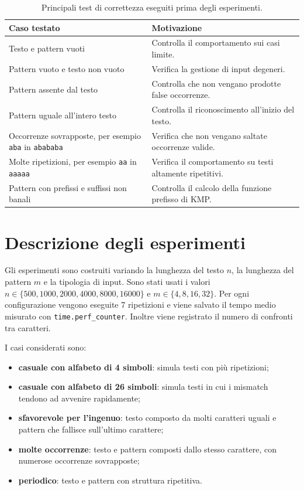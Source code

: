 \documentclass{article}
\begin{document}
\begin{table}[H]
\centering
\small
\begin{tabular}{p{}p{}}
\toprule
Caso testato & Motivazione \\
\midrule
Testo e pattern vuoti & Controlla il comportamento sui casi limite. \\
Pattern vuoto e testo non vuoto & Verifica la gestione di input degeneri. \\
Pattern assente dal testo & Controlla che non vengano prodotte false occorrenze. \\
Pattern uguale all'intero testo & Controlla il riconoscimento all'inizio del testo. \\
Occorrenze sovrapposte, per esempio \texttt{aba} in \texttt{abababa} & Verifica che non vengano saltate occorrenze valide. \\
Molte ripetizioni, per esempio \texttt{aa} in \texttt{aaaaa} & Verifica il comportamento su testi altamente ripetitivi. \\
Pattern con prefissi e suffissi non banali & Controlla il calcolo della funzione prefisso di KMP. \\
\bottomrule
\end{tabular}
\caption{Principali test di correttezza eseguiti prima degli esperimenti.}
\label{tab:test-correttezza}
\end{table}

\section{Descrizione degli esperimenti}
\label{sec:esperimenti}
Gli esperimenti sono costruiti variando la lunghezza del testo $n$, la lunghezza del pattern $m$ e la tipologia di input. Sono stati usati i valori $n \in \{500,1000,2000,4000,8000,16000\}$ e $m \in \{4,8,16,32\}$. Per ogni configurazione vengono eseguite 7 ripetizioni e viene salvato il tempo medio misurato con \texttt{time.perf\_counter}. Inoltre viene registrato il numero di confronti tra caratteri.

I casi considerati sono:
\begin{itemize}
    \item \textbf{casuale con alfabeto di 4 simboli}: simula testi con più ripetizioni;
    \item \textbf{casuale con alfabeto di 26 simboli}: simula testi in cui i mismatch tendono ad avvenire rapidamente;
    \item \textbf{sfavorevole per l'ingenuo}: testo composto da molti caratteri uguali e pattern che fallisce sull'ultimo carattere;
    \item \textbf{molte occorrenze}: testo e pattern composti dallo stesso carattere, con numerose occorrenze sovrapposte;
    \item \textbf{periodico}: testo e pattern con struttura ripetitiva.
\end{itemize}
\end{document}
